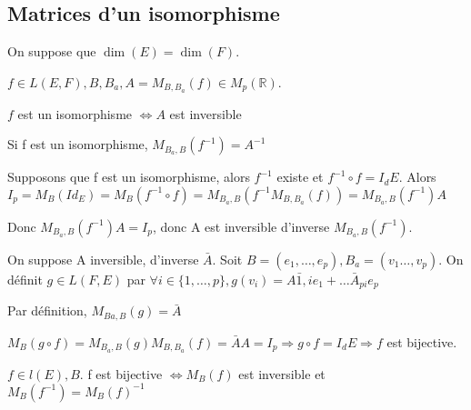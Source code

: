 \documentclass[french]{yLectureNote}
\newcommand{\R}[0]{\mathbb{R}}
\begin{document}
\subsection{Matrices d'un isomorphisme}
On suppose que \(\dim(E) = \dim(F)\).
\begin{proposition}
\(f\in L(E, F), B,B_a, A = M_{B,B_a}(f) \in M_{p}(\R)\).

\(f\) est un isomorphisme \(\iff A\) est inversible

Si f est un isomorphisme, \(M_{B_a, B}(f^{-1}) = A^{-1}\)
\end{proposition}
\begin{myproof}
Supposons que f est un isomorphisme, alors \(f^{-1}\) existe et \(f^{-1}\circ f = I_dE\). Alors \(I_p = M_B(Id_E) = M_B(f^{-1}\circ f)= M_{B_a,B}(f^{-1}M_{B,B_a}(f)) = M_{B_a,B}(f^{-1})A\)

Donc \(M_{B_a,B}(f^{-1})A = I_p\), donc A est inversible d'inverse \(M_{B_a,B}(f^{-1})\).


On suppose A inversible, d'inverse \(\bar{A}\). Soit \(B= (e_1,\dots, e_p), B_a = (v_1\dots, v_p)\). On définit \(g \in L(F,E)\) par \(\forall i\in \{1,\dots, p\}, g(v_i) = \bar{A1,i}e_1+\dots \bar{A}_{pi}e_p\)

Par définition, \(M_{Ba,B}(g) = \bar{A}\)

\(M_B(g\circ f) = M_{B_a,B}(g)M_{B,B_a}(f) = \bar{A}A = I_p \Rightarrow g\circ f = I_dE \Rightarrow f\) est bijective.
\end{myproof}
\begin{proposition}
\(f\in l(E), B\). f est bijective \(\iff M_B(f)\) est inversible et \(M_B(f^{-1}) = M_B(f)^{-1}\)
\end{proposition}
\end{document}
